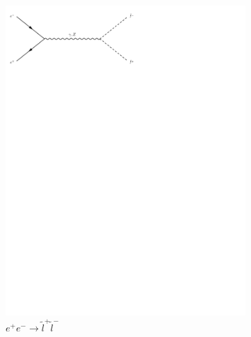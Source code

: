\begin{figure}[h]
\begin{subfigure}[b]{0.3\textwidth}
    \includegraphics[trim={0.5cm 22cm 10cm 0cm},width=\textwidth]{../Diagrams/D3.pdf}
    \caption{$e^+e^-\rightarrow \tilde{l}^+\tilde{l}^-$}
    \label{fey:3}
  \end{subfigure}
  \newline
  \newline
  \begin{subfigure}[b]{0.3\textwidth}

\end{subfigure}
\end{figure}
